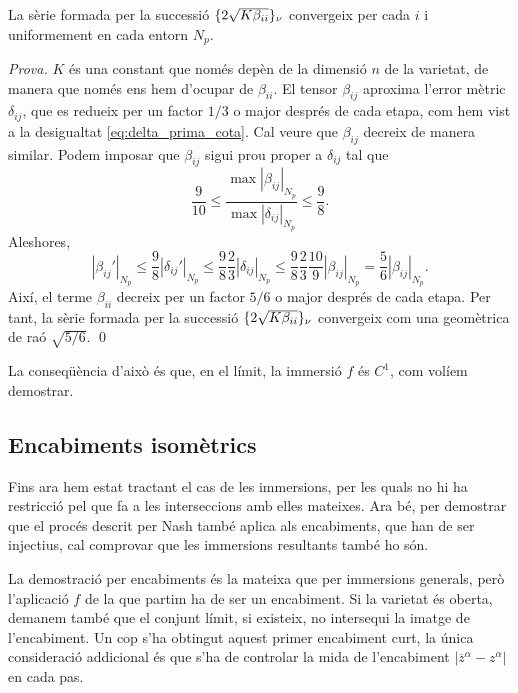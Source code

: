 \begin{prop}
    La sèrie formada per la successió $\{2\sqrt{K\beta_{ii}}\}_{\nu}$ convergeix per cada $i$ i uniformement en cada entorn $N_p$.
\end{prop}
{
\color{green!50!black} \textit{Prova.} 
$K$ és una constant que només depèn de la dimensió $n$ de la varietat, de manera que només ens hem d'ocupar de $\beta_{ii}$.
El tensor $\beta_{ij}$ aproxima l'error mètric $\delta_{ij}$, que es redueix per un factor $1/3$ o major després de cada etapa, com hem vist a la desigualtat \eqref{eq:delta_prima_cota}. Cal veure que $\beta_{ij}$ decreix de manera similar. Podem imposar que $\beta_{ij}$ sigui prou proper a $\delta_{ij}$ tal que 
\begin{equation}
    \frac{9}{10} \le \frac{\max|\beta_{ij}|_{N_p}}{\max|\delta_{ij}|_{N_p}} \le \frac{9}{8}.
\end{equation}
Aleshores,
\begin{equation}
    |\beta_{ij}'|_{N_p} \le \frac{9}{8}|\delta_{ij}'|_{N_p}\le \frac{9}{8}\frac{2}{3}|\delta_{ij}|_{N_p} \le \frac{9}{8}\frac{2}{3}\frac{10}{9}|\beta_{ij}|_{N_p} =  \frac{5}{6}|\beta_{ij}|_{N_p}.
\end{equation}
Així, el terme $\beta_{ii}$ decreix per un factor $5/6$ o major després de cada etapa. Per tant, la sèrie formada per la successió $\{2\sqrt{K\beta_{ii}}\}_{\nu}$ convergeix com una geomètrica de raó $\sqrt{5/6}$. \qed
}

\begin{obs}
    La conseqüència d'això és que, en el límit, la immersió $f$ és $C^1$, com volíem demostrar.
\end{obs}

\subsection{Encabiments isomètrics}

Fins ara hem estat tractant el cas de les immersions, per les quals no hi ha restricció pel que fa a les interseccions amb elles mateixes. Ara bé, per demostrar que el procés descrit per Nash també aplica als encabiments, que han de ser injectius, cal comprovar que les immersions resultants també ho són.

La demostració per encabiments és la mateixa que per immersions generals, però l'aplicació $f$ de la que partim ha de ser un encabiment. Si la varietat és oberta, demanem també que el conjunt límit, si existeix, no intersequi la imatge de l'encabiment. Un cop s'ha obtingut aquest primer encabiment curt, la única consideració addicional és que s'ha de controlar la mida de l'encabiment $|\overline z^\alpha - z^\alpha|$ en cada pas.

